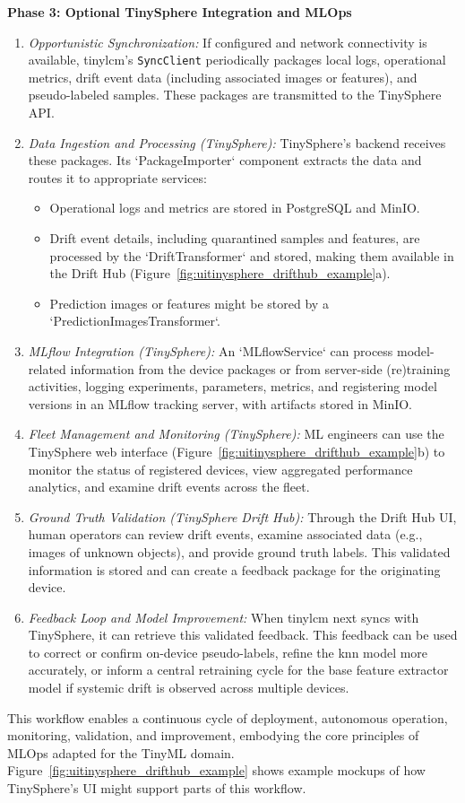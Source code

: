 \textbf{Phase 3: Optional TinySphere Integration and MLOps}
\begin{enumerate}[noitemsep, topsep=0pt]
    \item \textit{Opportunistic Synchronization:} If configured and network connectivity is available, \gls{tinylcm}'s \texttt{SyncClient} periodically packages local logs, operational metrics, drift event data (including associated images or features), and pseudo-labeled samples. These packages are transmitted to the TinySphere API.
    \item \textit{Data Ingestion and Processing (TinySphere):} TinySphere's backend receives these packages. Its `PackageImporter` component extracts the data and routes it to appropriate services:
        \begin{itemize}[noitemsep, topsep=0pt, leftmargin=1em]
            \item Operational logs and metrics are stored in PostgreSQL and MinIO.
            \item Drift event details, including quarantined samples and features, are processed by the `DriftTransformer` and stored, making them available in the Drift Hub (Figure~\ref{fig:uitinysphere_drifthub_example}a).
            \item Prediction images or features might be stored by a `PredictionImagesTransformer`.
        \end{itemize}
    \item \textit{MLflow Integration (TinySphere):} An `MLflowService` can process model-related information from the device packages or from server-side (re)training activities, logging experiments, parameters, metrics, and registering model versions in an MLflow tracking server, with artifacts stored in MinIO.
    \item \textit{Fleet Management and Monitoring (TinySphere):} ML engineers can use the TinySphere web interface (Figure~\ref{fig:uitinysphere_drifthub_example}b) to monitor the status of registered devices, view aggregated performance analytics, and examine drift events across the fleet.
    \item \textit{Ground Truth Validation (TinySphere Drift Hub):} Through the Drift Hub UI, human operators can review drift events, examine associated data (e.g., images of unknown objects), and provide ground truth labels. This validated information is stored and can create a feedback package for the originating device.
    \item \textit{Feedback Loop and Model Improvement:} When \gls{tinylcm} next syncs with TinySphere, it can retrieve this validated feedback. This feedback can be used to correct or confirm on-device pseudo-labels, refine the \gls{knn} model more accurately, or inform a central retraining cycle for the base feature extractor model if systemic drift is observed across multiple devices.
\end{enumerate}
This workflow enables a continuous cycle of deployment, autonomous operation, monitoring, validation, and improvement, embodying the core principles of MLOps adapted for the TinyML domain. Figure~\ref{fig:uitinysphere_drifthub_example} shows example mockups of how TinySphere's UI might support parts of this workflow. 


